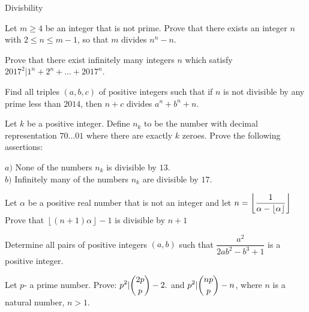 \documentclass{exam}
\begin{document}
\begin{center}
\begin{LARGE}
Divisbility
\end{LARGE}
\end{center}
\begin{questions}
\question  Let $m\ge4$ be an integer that is not prime. Prove that there exists an integer $n$ with $2\le n\le m-1$, so that $m$ divides $n^n- n $.

\question Prove that there exist infinitely many integers \(n\) which satisfy \(2017^2 | 1^n + 2^n + ... + 2017^n\).

\question Find all triples $(a,b,c)$ of positive integers such that if $n$ is not divisible by any prime less than $2014$, then $n+c$ divides $a^n+b^n+n$.

\question Let $k$ be a positive integer. Define $n_k$ to be the number with decimal representation $70...01$ where there are exactly $k$ zeroes. Prove the following assertions:

$a)$ None of the numbers $n_k$ is divisible by $13$.\\
$b)$ Infinitely many of the numbers $n_k$ are divisible by $17$.

\question Let $\alpha $ be a positive real number that is not an integer and let $\mathlarger{n=\left\lfloor \frac{1}{\alpha -\left\lfloor \alpha  \right\rfloor } \right\rfloor}$ Prove that $\left\lfloor \left( n+1 \right)\alpha  \right\rfloor -1$ is divisible by $n+1$

\question Determine all pairs of positive integers $(a,b)$ such that $ \dfrac{a^2}{2ab^2-b^3+1}  $ is a positive integer.

\question Let $p$- a prime number. Prove: $ \mathlarger{p^2|{2p\choose p}-2. }$ and $ \mathlarger{p^2|{np\choose p}-n}$, where $n$ is a natural number, $n>1$.
\end{questions}
\end{document}
